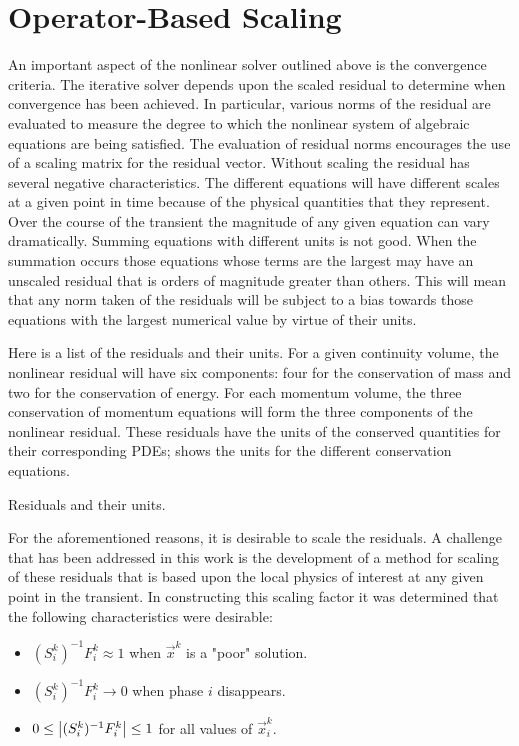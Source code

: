 \section{Operator-Based Scaling}
\label{sect:nln_scaling}
An important aspect of the nonlinear solver outlined above is the convergence criteria.
The iterative solver depends upon the scaled residual to determine when convergence has been achieved.
In particular, various norms of the residual are evaluated to measure the degree to which the nonlinear system of algebraic equations are being satisfied.
The evaluation of residual norms encourages the use of a scaling matrix for the residual vector.
Without scaling the residual has several negative characteristics.
The different equations will have different scales at a given point in time because of the physical quantities that they represent.
Over the course of the transient the magnitude of any given equation can vary dramatically.
Summing equations with different units is not good.
When the summation occurs those equations whose terms are the largest may have an unscaled residual that is orders of magnitude greater than others.
This will mean that any norm taken of the residuals will be subject to a bias towards those equations with the largest numerical value by virtue of their units.

Here is a list of the residuals and their units.
For a given continuity volume, the nonlinear residual will have six components: four for the conservation of mass and two for the conservation of energy.
For each momentum volume, the three conservation of momentum equations will form the three components of the nonlinear residual.
These residuals have the units of the conserved quantities for their corresponding PDEs;  shows the units for the different conservation equations.

\begin{table}[ht]
\centering

\caption{Residuals and their units.}
\label{tab:scaling_units_scales}
\end{table}

For the aforementioned reasons, it is desirable to scale the residuals.
A challenge that has been addressed in this work is the development of a method for scaling of these residuals that is based upon the local physics of interest at any given point in the transient.
In constructing this scaling factor it was determined that the following characteristics were desirable:

\begin{itemize}
\item{$(S_{i}^{k})^{-1} F^{k}_i \approx 1$ when $\vec{x}^{k}$ is a "poor" solution.}
\item{$(S_{i}^{k})^{-1} F^{k}_i \rightarrow 0$ when phase $i$ disappears.}
\item{$0 \leq \left|(S_{i}^{k})^{-1} F^{k}_{i}\right| \leq 1 $ for all values of $\vec{x}^{k}_i$.}
\end{itemize}

